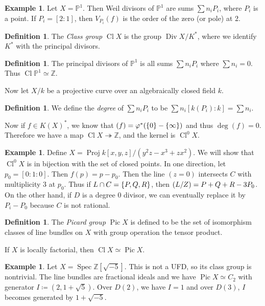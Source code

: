 \documentclass[leqno, openany]{memoir}
\theoremstyle{definition}
\newtheorem{defn}[thm]{Definition}
\newtheorem{exm}[thm]{Example}
\theoremstyle{remark}
\theoremstyle{plain}
\theoremstyle{definition}
\theoremstyle{remark}
\newcommand{\Z}{\mathbb{Z}}
\renewcommand{\P}{\mathbb{P}}
\DeclareMathOperator{\Pic}{Pic}
\DeclareMathOperator{\Cl}{Cl}
\DeclareMathOperator{\Spec}{Spec}
\DeclareMathOperator{\Proj}{Proj}
\begin{document}
\begin{exm}
    Let $X =\P^1$. Then Weil divisors of $\P^1$ are sums $\sum n_i P_i$, where $P_i$ is a point. If $P_i = [2:1]$, then $V_{P_i}(f)$ is the order of the zero (or pole) at $2$.
\end{exm}

\begin{defn}
    The \textit{Class group} $\operatorname{Cl} X$ is the group $\operatorname{Div} X / K^*$, where we identify $K^*$ with the principal divisors. 
\end{defn}

\begin{defn}
    The principal divisors of $\P^1$ is all sums $\sum n_i P_i$ where $\sum n_i = 0$. Thus $\operatorname{Cl} \P^1 \simeq \Z$.
\end{defn}

Now let $X/k$ be a projective curve over an algebraically closed field $k$.

\begin{defn}
    We define the \textit{degree} of $\sum n_i P_i$ to be $\sum n_i [k(P_i):k] = \sum n_i$.
\end{defn}

Now if $f \in K(X)^*$, we know that $(f) = \varphi^*(\qty{0} - \qty{\infty})$ and thus $\deg (f) = 0$. Therefore we have a map $\operatorname{Cl} X \twoheadrightarrow \Z$, and the kernel is $\operatorname{Cl}^0 X$.

\begin{exm}
    Define $X = \Proj k[x,y,z] / (y^2 z - x^3 + zx^2)$. We will show that $\Cl^0 X$ is in bijection with the set of closed points. In one direction, let $p_0 = [0:1:0]$. Then $f(p) = p - p_0$. Then the line $(z=0)$ intersects $C$ with multiplicity $3$ at $p_0$. Thus if $L \cap C = \qty{P,Q,R}$, then $\qty(L/Z) = P + Q + R - 3 P_0$. On the other hand, if $D$ is a degree $0$ divisor, we can eventually replace it by $P_i - P_0$ because $C$ is not rational.
\end{exm}

\begin{defn}
    The \textit{Picard group} $\Pic X$ is defined to be the set of isomorphism classes of line bundles on $X$ with group operation the tensor product.
\end{defn}

If $X$ is locally factorial, then $\Cl X \simeq \Pic X$.

\begin{exm}
    Let $X = \Spec \Z[\sqrt{-5}]$. This is not a UFD, so its class group is nontrivial. The line bundles are fractional ideals and we have $\Pic X \simeq C_2$ with generator $I \coloneqq (2, 1 + \sqrt{5})$. Over $D(2)$, we have $I = 1$ and over $D(3)$, $I$ becomes generated by $1 + \sqrt{-5}$.
\end{exm}
\end{document}
